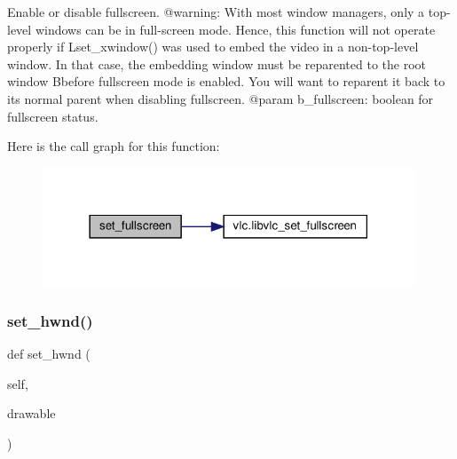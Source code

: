\begin{DoxyVerb}Enable or disable fullscreen.
@warning: With most window managers, only a top-level windows can be in
full-screen mode. Hence, this function will not operate properly if
L{set_xwindow}() was used to embed the video in a
non-top-level window. In that case, the embedding window must be reparented
to the root window B{before} fullscreen mode is enabled. You will want
to reparent it back to its normal parent when disabling fullscreen.
@param b_fullscreen: boolean for fullscreen status.
\end{DoxyVerb}
 Here is the call graph for this function\+:
\nopagebreak
\begin{figure}[H]
\begin{center}
\leavevmode
\includegraphics[width=314pt]{classvlc_1_1_media_player_ae0b0d98dfef2ddc6a696b9f04725dade_cgraph}
\end{center}
\end{figure}
\mbox{\label{classvlc_1_1_media_player_aee1140a71ab519fb1b1d4641272298fe}} 
\subsubsection{\texorpdfstring{set\+\_\+hwnd()}{set\_hwnd()}}
{\footnotesize\ttfamily def set\+\_\+hwnd (\begin{DoxyParamCaption}\item[{}]{self,  }\item[{}]{drawable }\end{DoxyParamCaption})}

